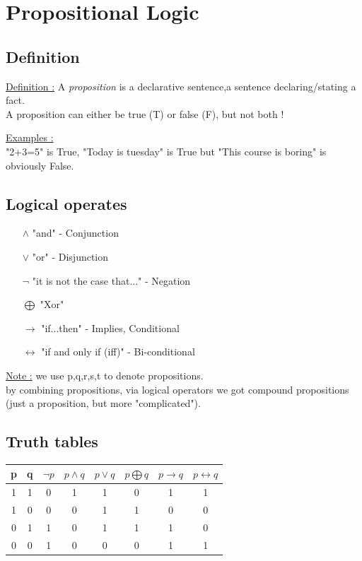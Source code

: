 \documentclass[12pt,a4paper]{article}
\begin{document}
\section{Propositional Logic}


\subsection{Definition}
\begin{boite}
\underline{Definition :}
	A \textit{proposition} is a declarative sentence,a sentence declaring/stating a fact.
	\\ A proposition can either be true (T) or false (F), but not both !
\end{boite}
\underline{Examples :}\\
"2+3=5" is True, "Today is tuesday" is True but "This course is boring" is obviously False.

\subsection{Logical operates}
\begin{itemize}
	\item[$\wedge$] "and" - Conjunction
	\item[$\vee$]  "or" - Disjunction
	\item[$\neg$] "it is not the case that..." - Negation
	\item[$\bigoplus$] "Xor"
	\item[$\rightarrow$] "if...then" - Implies, Conditional
	\item[$\leftrightarrow$] "if and only if (iff)" - Bi-conditional
\end{itemize}
\underline{Note :} we use p,q,r,s,t to denote propositions.\\
by combining propositions, via logical operators we got compound propositions (just a proposition, but more "complicated").

\subsection{Truth tables}
\begin{center}
\begin{tabular}{cc|cccccc}
p & q & $\neg p$ & $p \wedge q$ & $p \vee q$ & $p \bigoplus q$ & $p \rightarrow q$ & $p \leftrightarrow q$ \\ 
\hline 
1 & 1 & 0 & 1 & 1 & 0 & 1 & 1 \\ 
1 & 0 & 0 & 0 & 1 & 1 & 0 & 0 \\ 
0 & 1 & 1 & 0 & 1 & 1 & 1 & 0 \\ 
0 & 0 & 1 & 0 & 0 & 0 & 1 & 1 \\ 
\end{tabular} 
\end{center}
\end{document}

